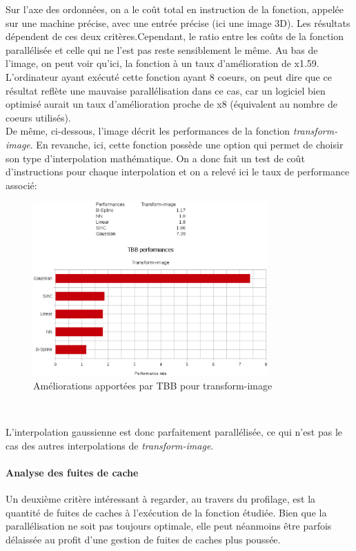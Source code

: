 \documentclass[10pt]{report}
\begin{document}
		Sur l'axe des ordonnées, on a le coût total en instruction de la fonction, appelée sur une machine précise, avec une entrée précise (ici une image 3D). Les résultats dépendent de ces deux critères.Cependant, le ratio entre les coûts de la fonction parallélisée et celle qui ne l'est pas reste sensiblement le même. Au bas de l'image, on peut voir qu'ici, la fonction à un taux d'amélioration de x1.59. L'ordinateur ayant exécuté cette fonction ayant 8 coeurs, on peut dire que ce résultat reflète une mauvaise parallélisation dans ce cas, car un logiciel bien optimisé aurait un taux d'amélioration proche de x8 (équivalent au nombre de coeurs utilisés).\\
		De même, ci-dessous, l'image décrit les performances de la fonction \textit{transform-image}. En revanche, ici, cette fonction possède une option qui permet de choisir son type d'interpolation mathématique. On a donc fait un test de coût d'instructions pour chaque interpolation et on a relevé ici le taux de performance associé:
		\begin{figure}[h!]
			\begin{center}
				\includegraphics[width=9cm]{Reports/figures/performances_tbb_transform_image.eps}
			\end{center}	
			\caption{Améliorations apportées par TBB pour transform-image}
			\label{Améliorations apportées par TBB pour transform-image}
		\end{figure}~\par
		L'interpolation gaussienne est donc parfaitement parallélisée, ce qui n'est pas le cas des autres interpolations de \textit{transform-image}.
		
		\paragraph{Analyse des fuites de cache}
		Un deuxième critère intéressant à regarder, au travers du profilage, est la quantité de fuites de caches à l'exécution de la fonction étudiée. Bien que la parallélisation ne soit pas toujours optimale, elle peut néanmoins être parfois délaissée au profit d'une gestion de fuites de caches plus poussée.
		
\end{document}
